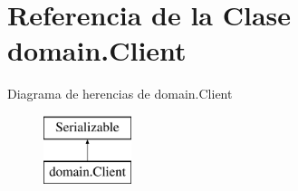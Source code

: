 \hypertarget{classdomain_1_1_client}{}\section{Referencia de la Clase domain.\+Client}
\label{classdomain_1_1_client}
Diagrama de herencias de domain.\+Client\begin{figure}[H]
\begin{center}
\leavevmode
\includegraphics[height=2.000000cm]{classdomain_1_1_client}
\end{center}
\end{figure}
